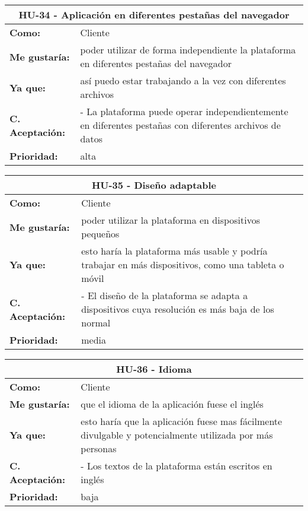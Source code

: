 \begin{table}[H]
	\begin{tabular}{| p{3cm}| p{11cm} |}
		\hline
		\multicolumn{2}{|c|}{\textbf{HU-34} - Aplicación en diferentes pestañas del navegador} \\ \hline
		\textbf{Como:} & Cliente \\ \hline
		\textbf{Me gustaría:} & poder utilizar de forma independiente la plataforma en diferentes pestañas del navegador \\ \hline
		\textbf{Ya que:} & así puedo estar trabajando a la vez con diferentes archivos \\ \hline
		\textbf{C. Aceptación:} & - La plataforma puede operar independientemente en diferentes pestañas con diferentes archivos de datos \\ \hline
		\textbf{\textbf{Prioridad:}} & alta \\ \hline
	\end{tabular}
\end{table}


\begin{table}[H]
	\begin{tabular}{| p{3cm}| p{11cm} |}
		\hline
		\multicolumn{2}{|c|}{\textbf{HU-35} - Diseño adaptable} \\ \hline
		\textbf{Como:} & Cliente \\ \hline
		\textbf{Me gustaría:} & poder utilizar la plataforma en dispositivos pequeños \\ \hline
		\textbf{Ya que:} & esto haría la plataforma más usable y podría trabajar en más dispositivos, como una tableta o móvil \\ \hline
		\textbf{C. Aceptación:} & - El diseño de la plataforma se adapta a dispositivos cuya resolución es más baja de los normal \\ \hline
		\textbf{\textbf{Prioridad:}} & media \\ \hline
	\end{tabular}
\end{table}


\begin{table}[H]
	\begin{tabular}{| p{3cm}| p{11cm} |}
		\hline
		\multicolumn{2}{|c|}{\textbf{HU-36} - Idioma} \\ \hline
		\textbf{Como:} & Cliente \\ \hline
		\textbf{Me gustaría:} & que el idioma de la aplicación fuese el inglés \\ \hline
		\textbf{Ya que:} & esto haría que la aplicación fuese mas fácilmente divulgable y potencialmente utilizada por más personas \\ \hline
		\textbf{C. Aceptación:} & - Los textos de la plataforma están escritos en inglés \\ \hline
		\textbf{\textbf{Prioridad:}} & baja \\ \hline
	\end{tabular}
\end{table}

